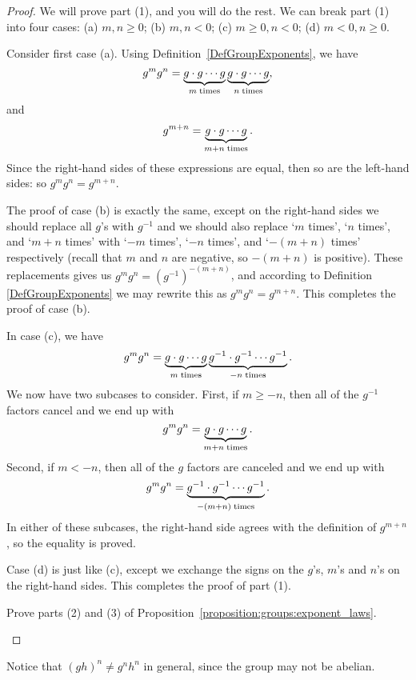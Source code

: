 \begin{proof}
We will prove part (1), and you will do the rest. We can break part (1) into four cases: (a) $m,n \ge 0$; (b) $m,n < 0$; 
(c) $m \ge 0, n< 0$; (d) $m<0, n \ge 0$. 

Consider first case (a). 
Using Definition~\ref{DefGroupExponents}, we have
\[
g^m g^n = \underbrace{g \cdot g \cdots g}_{m \; {\rm times}}\underbrace{g \cdot g \cdots g}_{n \; {\rm times}},
\]
and
\[
g^{m+n} = \underbrace{g \cdot g \cdots g}_{m+n \; {\rm times}}.
\]
Since the right-hand sides of these expressions are equal, then so are the left-hand sides: so $g^mg^n = g^{m+n}$.

The proof of case (b) is exactly the same, except on the right-hand sides we should replace all $g$'s with $g^{-1}$ and we should also replace `$m$ times', `$n$ times', and `$m+n$ times' with `$-m$ times', `$-n$ times', and `$-(m+n)$ times' respectively (recall that $m$ and $n$ are negative, so $-(m+n)$ is positive). These replacements gives us
$g^mg^n =( g^{-1})^{-(m+n)}$, and according to Definition \ref{DefGroupExponents} we may rewrite this as  $g^mg^n = g^{m+n}$. This completes the proof of case (b).

In case (c), we have
\[
g^m g^n = \underbrace{g \cdot g \cdots g}_{m \; {\rm times}}\underbrace{g^{-1} \cdot g^{-1} \cdots g^{-1}}_{-n \; {\rm times}}.
\]
We now have two subcases to consider. First, if $m \ge -n$, then all of the $g^{-1}$ factors cancel and we end up with
\[
g^m g^n = \underbrace{g \cdot g \cdots g}_{m+n \; {\rm times}}.
\]
Second, if $m < -n$, then all of the $g$ factors are canceled and we end up with
\[
g^m g^n = \underbrace{g^{-1} \cdot g^{-1} \cdots g^{-1}}_{-(m+n) \; {\rm times}}.
\]
In either of these subcases, the right-hand side agrees with the definition of $g^{m+n}$, so the equality is proved.

Case (d) is just like (c), except we exchange the signs  on the $g$'s,  $m$'s and $n$'s on the right-hand sides. This completes the proof of part (1).


\begin{exercise}{59}
Prove parts (2) and (3) of Proposition~\ref{proposition:groups:exponent_laws}.
\end{exercise}
\end{proof} 

Notice that $(gh)^n \neq g^nh^n$ in general, since the group may not be abelian.

